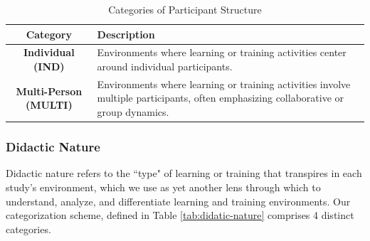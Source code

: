 \documentclass[manuscript,screen,review]{acmart}
\begin{document}

\begin{table}[ht]
    \centering
    \caption{Categories of Participant Structure}
    \begin{tabular}{|c|p{}|}
        \hline
        \textbf{Category} & \textbf{Description} \\
        \hline
        \textbf{Individual (IND)} & Environments where learning or training activities center around individual participants. \\
        \hline
        \textbf{Multi-Person (MULTI)} & Environments where learning or training activities involve multiple participants, often emphasizing collaborative or group dynamics. \\
        \hline
    \end{tabular}
    \label{tab:participant-structure}
\end{table}

\subsubsection{Didactic Nature} \label{subsec:didactic_nature}

Didactic nature refers to the ``type" of learning or training that transpires in each study's environment, which we use as yet another lens through which to understand, analyze, and differentiate learning and training environments. Our categorization scheme, defined in Table \ref{tab:didatic-nature} comprises 4 distinct categories.


    
\end{document}
